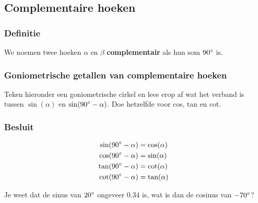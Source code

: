 \documentclass[a4paper,12pt]{article}
\begin{document}
\begin{theorie}

\pagebreak
\subsection{Complementaire hoeken}

\subsubsection*{Definitie}
We noemen twee hoeken $\alpha$ en $\beta$ \textbf{complementair} als hun som $90^\circ$ is.

\subsubsection*{Goniometrische getallen van complementaire hoeken}
Teken hieronder een goniometrische cirkel en lees erop af wat het verband is tussen $\sin(\alpha)$ en $\sin(90^\circ-\alpha)$. Doe hetzelfde voor cos, tan en cot.
\vspace*{7cm}

\subsubsection*{Besluit}
\begin{align*}
  \sin(90^\circ-\alpha)&=\cos(\alpha)\\
  \cos(90^\circ-\alpha)&=\sin(\alpha)\\
  \tan(90^\circ-\alpha)&=\cot(\alpha)\\
  \cot(90^\circ-\alpha)&=\tan(\alpha)
\end{align*}

\end{theorie}

\begin{oefening}
Je weet dat de sinus van $20^\circ$ ongeveer $0.34$ is, wat is dan de cosinus van $-70^\circ$?
\end{oefening}
\end{document}
